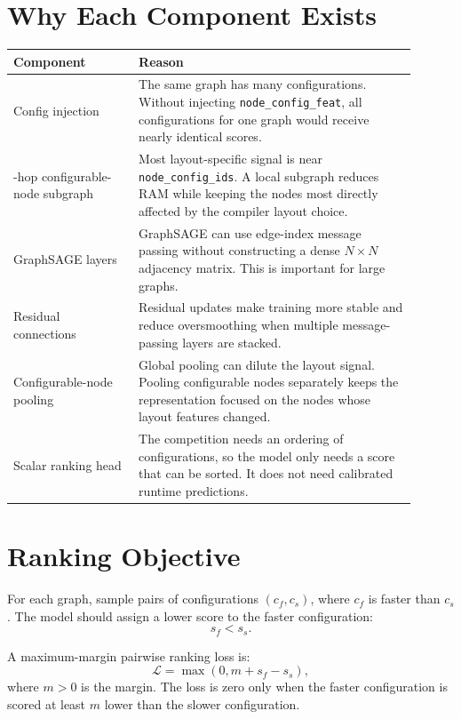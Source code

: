 \documentclass[11pt]{article}
\begin{document}
\section{Why Each Component Exists}

\begin{table}[h]
\centering
\begin{tabular}{@{}p{0.28\linewidth}p{0.62\linewidth}@{}}
\toprule
\textbf{Component} & \textbf{Reason} \\
\midrule
Config injection &
The same graph has many configurations. Without injecting \texttt{node\_config\_feat},
all configurations for one graph would receive nearly identical scores. \\
\addlinespace
2-hop configurable-node subgraph &
Most layout-specific signal is near \texttt{node\_config\_ids}. A local subgraph
reduces RAM while keeping the nodes most directly affected by the compiler layout choice. \\
\addlinespace
GraphSAGE layers &
GraphSAGE can use edge-index message passing without constructing a dense
\(N \times N\) adjacency matrix. This is important for large graphs. \\
\addlinespace
Residual connections &
Residual updates make training more stable and reduce oversmoothing when multiple
message-passing layers are stacked. \\
\addlinespace
Configurable-node pooling &
Global pooling can dilute the layout signal. Pooling configurable nodes separately
keeps the representation focused on the nodes whose layout features changed. \\
\addlinespace
Scalar ranking head &
The competition needs an ordering of configurations, so the model only needs a
score that can be sorted. It does not need calibrated runtime predictions. \\
\bottomrule
\end{tabular}
\end{table}

\section{Ranking Objective}

For each graph, sample pairs of configurations \((c_f, c_s)\), where \(c_f\) is
faster than \(c_s\). The model should assign a lower score to the faster
configuration:
\[
s_f < s_s.
\]

A maximum-margin pairwise ranking loss is:
\[
\mathcal{L}
= \max(0, m + s_f - s_s),
\]
where \(m > 0\) is the margin. The loss is zero only when the faster
configuration is scored at least \(m\) lower than the slower configuration.
\end{document}
